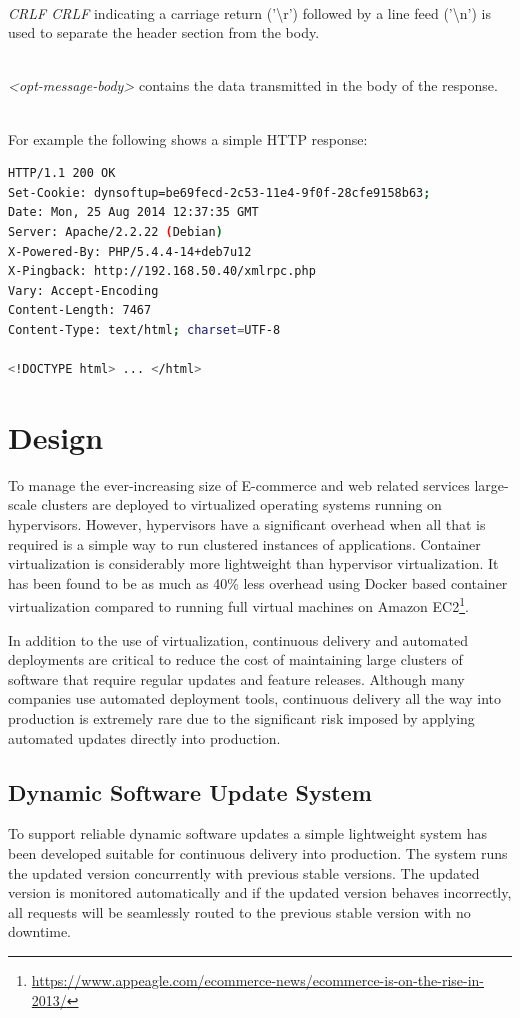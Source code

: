 \documentclass[a4paper,11pt,twoside]{report}
\begin{document}
\noindent\\
\textit{CRLF CRLF} indicating a carriage return ('\textbackslash r') followed by a line feed ('\textbackslash n') is used to separate the header section from the body. 

\noindent\\
\textit{<opt-message-body>} contains the data transmitted in the body of the response.

\noindent\\
For example the following shows a simple HTTP response:
\indent
\begin{lstlisting}[language=bash,xleftmargin=.25in,xrightmargin=.25in]
HTTP/1.1 200 OK
Set-Cookie: dynsoftup=be69fecd-2c53-11e4-9f0f-28cfe9158b63;
Date: Mon, 25 Aug 2014 12:37:35 GMT
Server: Apache/2.2.22 (Debian)
X-Powered-By: PHP/5.4.4-14+deb7u12
X-Pingback: http://192.168.50.40/xmlrpc.php
Vary: Accept-Encoding
Content-Length: 7467
Content-Type: text/html; charset=UTF-8

<!DOCTYPE html> ... </html>
\end{lstlisting} 
\clearpage

\chapter{Design}\label{Design}
To manage the ever-increasing size of E-commerce and web related services large-scale clusters are deployed to virtualized operating systems running on hypervisors. However, hypervisors have a significant overhead when all that is required is a simple way to run clustered instances of applications. Container virtualization is considerably more lightweight than hypervisor virtualization. It has been found to be as much as 40\% less overhead using Docker based container virtualization compared to running full virtual machines on Amazon EC2\footnote{\url{https://www.appeagle.com/ecommerce-news/ecommerce-is-on-the-rise-in-2013/}}.

In addition to the use of virtualization, continuous delivery and automated deployments are critical to reduce the cost of maintaining large clusters of software that require regular updates and feature releases. Although many companies use automated deployment tools, continuous delivery all the way into production is extremely rare due to the significant risk imposed by applying automated updates directly into production.

\section{Dynamic Software Update System}\label{modes} 
To support reliable dynamic software updates a simple lightweight system has been developed suitable for continuous delivery into production. The system runs the updated version concurrently with previous stable versions. The updated version is monitored automatically and if the updated version behaves incorrectly, all requests will be seamlessly routed to the previous stable version with no downtime.
\end{document}
